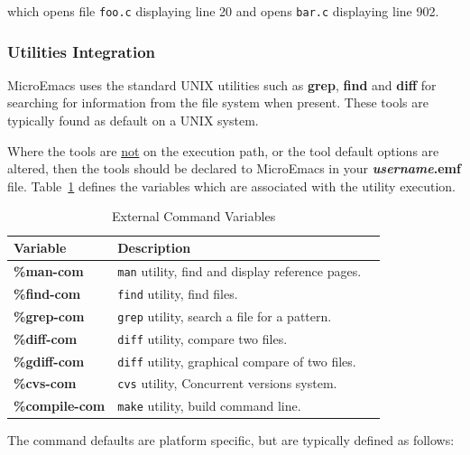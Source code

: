 \documentclass[11pt,a4paper,pdftex]{article}
\begin{document}
  which opens file \texttt{foo.c} displaying line 20 and opens \texttt{bar.c}
  displaying line 902.

\subsubsection{Utilities Integration}

  MicroEmacs uses the standard UNIX utilities such as \textbf{grep},
  \textbf{find} and \textbf{diff} for searching for information from the file
  system when present. These tools are typically found as default on a UNIX
  system. 

  Where the tools are \underline{not} on the execution path, or the tool
  default options are altered, then the tools should be declared to MicroEmacs
  in your \textbf{\textit{username}.emf} file. Table~\ref{tab:com} defines
  the variables which are associated with the utility execution.

  \begin{table}[ht]
   \begin{center}
    \begin{tabular}{lll}
    \textbf{Variable} & \textbf{Description} \\ \hline
    \textbf{\%man-com} & \texttt{man} utility, find and display reference pages.\\
    \textbf{\%find-com} & \texttt{find} utility, find files.\\
    \textbf{\%grep-com} & \texttt{grep} utility, search a file for a pattern.\\
    \textbf{\%diff-com} & \texttt{diff} utility, compare two files.\\
    \textbf{\%gdiff-com} & \texttt{diff} utility, graphical compare of two files.\\
    \textbf{\%cvs-com} & \texttt{cvs} utility, Concurrent versions system.\\
    \textbf{\%compile-com} & \texttt{make} utility, build command line. \\ \hline
    \end{tabular}
    \caption{External Command Variables}
    \label{tab:com}
   \end{center}
  \end{table}
  
  The command defaults are platform specific, but are typically defined as
  follows:
  
\end{document}
